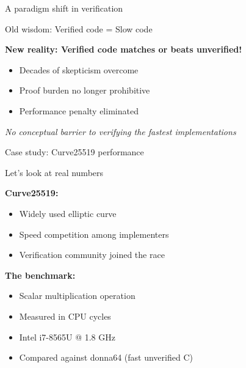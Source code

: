 \documentclass[aspectratio=169, lualatex, handout]{beamer}
\begin{document}
\begin{frame}{A paradigm shift in verification}
	\begin{center}
		\Large
		Old wisdom: Verified code = Slow code

		\vspace{1em}

		\textbf{New reality: Verified code matches or beats unverified!}
	\end{center}
	\vspace{1em}
	\begin{itemize}
		\item Decades of skepticism overcome
		\item Proof burden no longer prohibitive
		\item Performance penalty eliminated
	\end{itemize}
	\vspace{0.5em}
	\begin{center}
		\textit{No conceptual barrier to verifying the fastest implementations}
	\end{center}
\end{frame}

\begin{frame}{Case study: Curve25519 performance}
	\begin{center}
		\Large
		Let's look at real numbers
	\end{center}
	\vspace{1em}
	\textbf{Curve25519:}
	\begin{itemize}
		\item Widely used elliptic curve
		\item Speed competition among implementers
		\item Verification community joined the race
	\end{itemize}
	\vspace{0.5em}
	\textbf{The benchmark:}
	\begin{itemize}
		\item Scalar multiplication operation
		\item Measured in CPU cycles
		\item Intel i7-8565U @ 1.8 GHz
		\item Compared against donna64 (fast unverified C)
	\end{itemize}
\end{frame}
\end{document}
